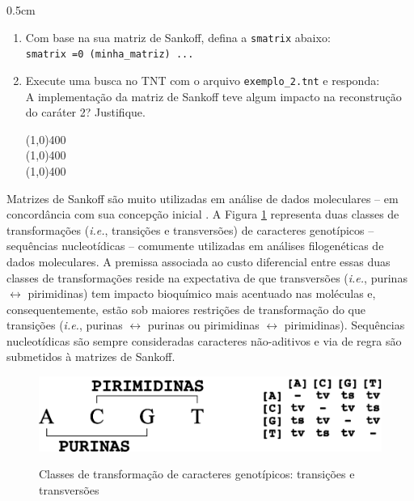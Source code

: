 \begin{refsection}
\begin {myindentpar}{0.5cm}
\begin{enumerate}[\itshape i.]
	\item{Com base na sua matriz de Sankoff, defina a \texttt{smatrix} abaixo:}\\
\texttt{smatrix =0 (minha\_matriz) ... }

\vspace{90pt}

	\item{Execute uma busca no TNT com o arquivo \texttt{exemplo\_2.tnt} e responda:}\\
	A implementação da matriz de Sankoff teve algum impacto na reconstrução do caráter 2? Justifique.
	
	\line(1,0){400}\\
	\line(1,0){400}\\
	\line(1,0){400}\\

\end{enumerate}
\end{myindentpar}

Matrizes de Sankoff são muito utilizadas em análise de dados moleculares -- em concordância com sua concepção inicial \parencite{Sankoff_1975}. A Figura \ref{tut6:fig:tv_ts} representa duas classes de transformações (\textit{i.e.}, transições e transversões) de caracteres genotípicos -- sequências nucleotídicas -- comumente utilizadas em análises filogenéticas de dados moleculares. A premissa associada ao custo diferencial entre essas duas classes de transformações reside na expectativa de que transversões (\textit{i.e.}, purinas $\longleftrightarrow$ pirimidinas) tem impacto bioquímico mais acentuado nas moléculas e, consequentemente, estão sob maiores restrições de transformação do que transições (\textit{i.e.}, purinas $\longleftrightarrow$ purinas ou pirimidinas $\longleftrightarrow$ pirimidinas). Sequências nucleotídicas são sempre consideradas caracteres não-aditivos e via de regra são submetidos à matrizes de Sankoff.

  \begin{figure}[H]
      {\includegraphics[scale=1.00]{figures/tut6/tv_ts.eps}}
	{\caption[Classes de transformação de caracteres genotípicos]{Classes de transformação de caracteres genotípicos: transições e transversões}\label{tut6:fig:tv_ts}}
  \end{figure}


\end{refsection}
